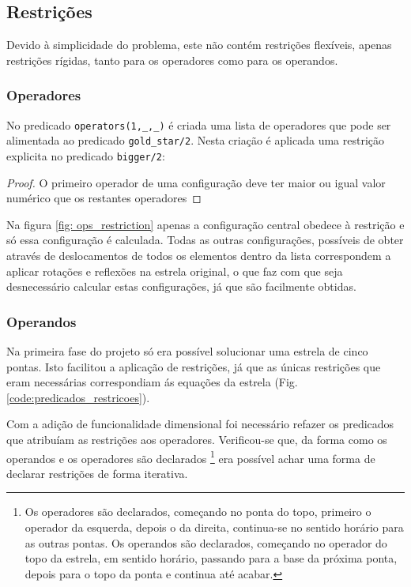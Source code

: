 \subsection{Restrições}

Devido à simplicidade do problema, este não contém restrições flexíveis, apenas restrições rígidas, tanto para os operadores como para os operandos.


\subsubsection{Operadores} No predicado \verb|operators(1,_,_)| é criada uma lista de operadores que pode ser alimentada ao predicado \verb|gold_star/2|. Nesta criação é aplicada uma restrição explicita no predicado \verb|bigger/2|:

\begin{proof}
O primeiro operador de uma configuração deve ter maior ou igual valor numérico que os restantes operadores
\end{proof}



Na figura \ref{fig: ops_restriction} apenas a configuração central obedece à restrição e só essa configuração é calculada. Todas as outras configurações, possíveis de obter através de deslocamentos de todos os elementos dentro da lista correspondem a aplicar rotações e reflexões na estrela original, o que faz com que seja desnecessário calcular estas configurações, já que são facilmente obtidas.




\subsubsection{Operandos} Na primeira fase do projeto só era possível solucionar uma estrela de cinco pontas. Isto facilitou a aplicação de restrições, já que as únicas restrições que eram necessárias correspondiam ás equações da estrela (Fig. \ref{code:predicados_restricoes}).

Com a adição de funcionalidade dimensional foi necessário refazer os predicados que atribuíam as restrições aos operadores. Verificou-se que, da forma como os operandos e os operadores são declarados \footnote{Os operadores são declarados, começando no ponta do topo, primeiro o operador da esquerda, depois o da direita, continua-se no sentido horário para as outras pontas. Os operandos são declarados, começando no operador do topo da estrela, em sentido horário, passando para a base da próxima ponta, depois para o topo da ponta e continua até acabar.} era possível achar uma forma de declarar restrições de forma iterativa.

